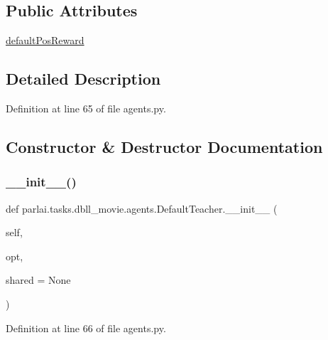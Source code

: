 \subsection*{Public Attributes}
\begin{DoxyCompactItemize}
\item 
\hyperlink{classparlai_1_1tasks_1_1dbll__movie_1_1agents_1_1DefaultTeacher_a8349f6694fcf25ac83d5f0972d99fede}{default\+Pos\+Reward}
\end{DoxyCompactItemize}


\subsection{Detailed Description}


Definition at line 65 of file agents.\+py.



\subsection{Constructor \& Destructor Documentation}
\mbox{\label{classparlai_1_1tasks_1_1dbll__movie_1_1agents_1_1DefaultTeacher_a66c1dbd7bb3e1b49e3c145235f1fffa0}} 
\subsubsection{\texorpdfstring{\+\_\+\+\_\+init\+\_\+\+\_\+()}{\_\_init\_\_()}}
{\footnotesize\ttfamily def parlai.\+tasks.\+dbll\+\_\+movie.\+agents.\+Default\+Teacher.\+\_\+\+\_\+init\+\_\+\+\_\+ (\begin{DoxyParamCaption}\item[{}]{self,  }\item[{}]{opt,  }\item[{}]{shared = {\ttfamily None} }\end{DoxyParamCaption})}



Definition at line 66 of file agents.\+py.


